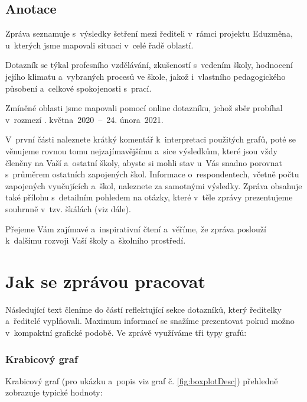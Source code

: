\documentclass[12pt,a4paper,]{report}
\begin{document}
\thispagestyle{empty}
\section*{Anotace}
Zpráva seznamuje s~výsledky šetření mezi řediteli v~rámci projektu Eduzměna, u~kterých jsme mapovali situaci v~celé řadě oblastí.

Dotazník se týkal profesního vzdělávání, zkušeností s~vedením školy, hodnocení jejího klimatu a~vybraných procesů ve škole, jakož i~vlastního pedagogického působení a~celkové spokojenosti s~prací.

Zmíněné oblasti jsme mapovali pomocí online dotazníku, jehož sběr probíhal v~rozmezí . května~2020~\nobreakdash--~24. února~2021.

V~první části naleznete krátký komentář k~interpretaci použitých grafů, poté se věnujeme rovnou tomu nejzajímavějšímu a~sice výsledkům, které jsou vždy členěny na Vaší a~ostatní školy, abyste si mohli stav u~Vás snadno porovnat s~průměrem ostatních zapojených škol. Informace o~respondentech, včetně počtu zapojených vyučujících a~škol, naleznete za samotnými výsledky. Zpráva obsahuje také přílohu s~detailním pohledem na otázky, které v~těle zprávy prezentujeme souhrnně v~tzv. škálách (viz dále).

Přejeme Vám zajímavé a~inspirativní čtení a~věříme, že zpráva poslouží k~dalšímu rozvoji Vaší školy a~školního prostředí.


{
\renewcommand*\contentsname{Obsah zprávy}
\setcounter{tocdepth}{1}
\tableofcontents
}

\hypertarget{jak-se-zpruxe1vou-pracovat}{%
\chapter{Jak se zprávou pracovat}\label{jak-se-zpruxe1vou-pracovat}}

Následující text členíme do částí reflektující sekce dotazníků, který ředitelky a~ředitelé vyplňovali. Maximum informací se snažíme prezentovat pokud možno v~kompaktní grafické podobě. Ve zprávě využíváme tři typy grafů:

\hypertarget{krabicovuxfd-graf}{%
\subsection{Krabicový graf}\label{krabicovuxfd-graf}}

Krabicový graf (pro ukázku a~popis viz graf č. \ref{fig:boxplotDesc}) přehledně zobrazuje typické hodnoty:
\end{document}
